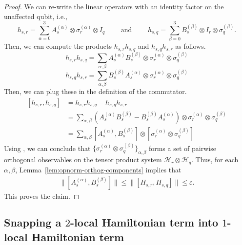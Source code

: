 \documentclass[11pt]{article}
\theoremstyle{plain}
\newcommand{\eps}{\varepsilon}
\begin{document}
\begin{proof}
We can re-write the linear operators with an identity factor on the unaffected qubit, i.e.,
    \begin{equation}
        h_{s,r} = \sum\limits_{\alpha = 0}^{3} A_s^{(\alpha)} \otimes \sigma_r^{(\alpha)} \otimes I_{q}\quad\quad\text{ and } \quad\quad h_{s,q} = \sum\limits_{\beta = 0}^{3} B_s^{(\beta)} \otimes I_r \otimes \sigma_q^{(\beta)}.
    \end{equation}
Then, we can compute the products $h_{s,r} h_{s,q}$ and $h_{s,q} h_{s,r}$ as follows.
\begin{equation}
    h_{s,r} h_{s,q} = \sum\limits_{\alpha, \beta} A_s^{(\alpha)} B_s^{(\beta)} \otimes \sigma_r^{(\alpha)} \otimes \sigma_q^{(\beta)}
\end{equation}
\begin{equation}
    h_{s,q} h_{s,r} = \sum\limits_{\alpha, \beta}  B_s^{(\beta)} A_s^{(\alpha)} \otimes \sigma_r^{(\alpha)} \otimes \sigma_q^{(\beta)}
\end{equation}
Then, we can plug these in the definition of the commutator.
\begin{align*}
    \left[h_{s,r}, h_{s,q}\right] &= h_{s,r} h_{s,q} - h_{s,q} h_{s,r}\\
    &= \sum\limits_{\alpha, \beta} \left(A_s^{(\alpha)} B_s^{(\beta)} - B_s^{(\beta)} A_s^{(\alpha)}\right) \otimes \sigma_r^{(\alpha)} \otimes \sigma_q^{(\beta)}\\
    &= \sum\limits_{\alpha, \beta} \left[A_s^{(\alpha)}, B_s^{(\beta)} \right] \otimes \left[\sigma_r^{(\alpha)} \otimes \sigma_q^{(\beta)}\right]
\end{align*}
Using , we can conclude that $\{\sigma_r^{(\alpha)} \otimes \sigma_q^{(\beta)}\}_{\alpha,\beta}$ forms a set of pairwise orthogonal observables on the tensor product system $\mathcal{H}_r \otimes \mathcal{H}_q$. Thus, for each $\alpha, \beta$, Lemma~\ref{lem:opnorm-orthog-components} implies that 
\begin{align}
\|[A_s^{(\alpha)}, B_s^{(\beta)}]\| \leq \|[H_{s, r}, H_{s, q}]\| \leq \eps.
\end{align}
This proves the claim.
\end{proof}

\subsection{Snapping a $2$-local Hamiltonian term into $1$-local Hamiltonian term}
\end{document}
